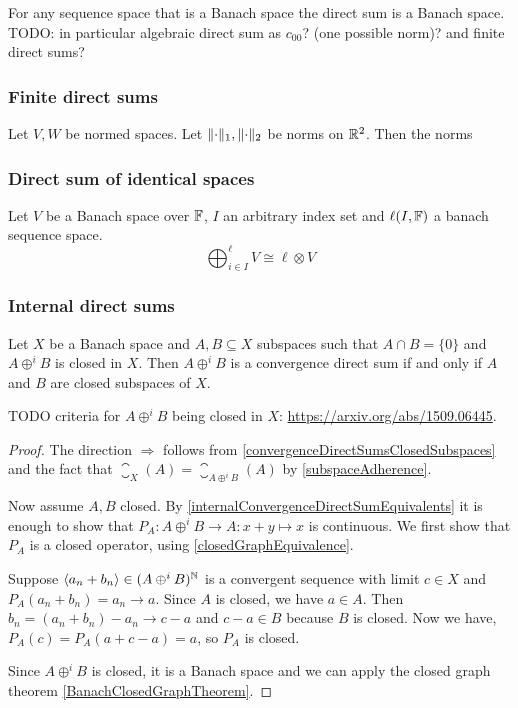 \begin{proposition}
For any sequence space that is a Banach space the direct sum is a Banach space. TODO: in particular algebraic direct sum as $c_{00}$? (one possible norm)? and finite direct sums?
\end{proposition}

\subsubsection{Finite direct sums}

\begin{proposition}
Let $V,W$ be normed spaces. Let $\lVert\cdot\rVert_1, \lVert\cdot\rVert_2$ be norms on $\mathbb{R}^2$. Then the norms
\end{proposition}



\subsubsection{Direct sum of identical spaces}
\begin{proposition}
Let $V$ be a Banach space over $\mathbb{F}$, $I$ an arbitrary index set and $\ell(I,\mathbb{F})$ a banach sequence space.
\[ \bigoplus_{i\in I}^\ell V \cong \ell\otimes V \]
\end{proposition}

\subsubsection{Internal direct sums}
\begin{proposition} \label{directSumClosedSubspacesBanachSpace}
Let $X$ be a Banach space and $A,B\subseteq X$ subspaces such that $A\cap B = \{0\}$ and $A\oplus^i B$ is closed in $X$. Then $A\oplus^i B$ is a convergence direct sum \textup{if and only if} $A$ and $B$ are closed subspaces of $X$.
\end{proposition}
TODO criteria for $A\oplus^i B$ being closed in $X$: \url{https://arxiv.org/abs/1509.06445}.
\begin{proof}
The direction $\Rightarrow$ follows from \ref{convergenceDirectSumsClosedSubspaces} and the fact that $\closure_X(A) = \closure_{A\oplus^i B}(A)$ by \ref{subspaceAdherence}.

Now assume $A,B$ closed. By \ref{internalConvergenceDirectSumEquivalents} it is enough to show that $P_A: A\oplus^i B \to A: x+y \mapsto x$ is continuous. We first show that $P_A$ is a closed operator, using \ref{closedGraphEquivalence}.

Suppose $\left\langle a_n+b_n \right\rangle \in (A\oplus^i B)^{\mathbb{N}}$ is a convergent sequence with limit $c\in X$ and $P_A(a_n+b_n) = a_n \to a$. Since $A$ is closed, we have $a\in A$. Then $b_n = (a_n+b_n)- a_n \to c-a$ and $c-a\in B$ because $B$ is closed. Now we have, $P_A(c) = P_A(a+c-a) = a$, so $P_A$ is closed.

Since $A\oplus^i B$ is closed, it is a Banach space and we can apply the closed graph theorem \ref{BanachClosedGraphTheorem}.
\end{proof}



